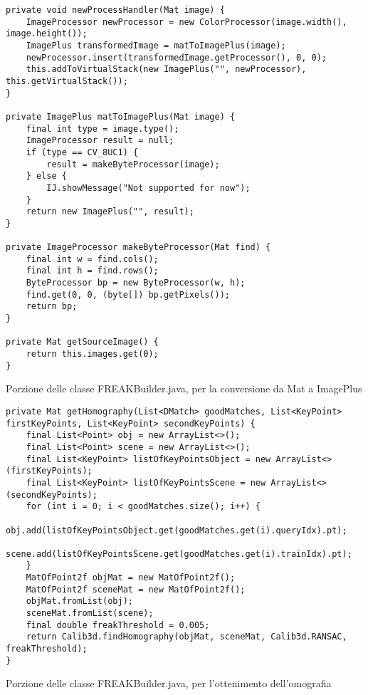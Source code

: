 \begin{listing}[H]
\begin{verbatim}
private void newProcessHandler(Mat image) {
    ImageProcessor newProcessor = new ColorProcessor(image.width(), image.height());
    ImagePlus transformedImage = matToImagePlus(image);
    newProcessor.insert(transformedImage.getProcessor(), 0, 0);
    this.addToVirtualStack(new ImagePlus("", newProcessor), this.getVirtualStack());
}

private ImagePlus matToImagePlus(Mat image) {
    final int type = image.type();
    ImageProcessor result = null;
    if (type == CV_8UC1) {
        result = makeByteProcessor(image);
    } else {
        IJ.showMessage("Not supported for now");
    }
    return new ImagePlus("", result);
}

private ImageProcessor makeByteProcessor(Mat find) {
    final int w = find.cols();
    final int h = find.rows();
    ByteProcessor bp = new ByteProcessor(w, h);
    find.get(0, 0, (byte[]) bp.getPixels());
    return bp;
}

private Mat getSourceImage() {
    return this.images.get(0);
}
\end{verbatim}
\caption{Porzione delle classe FREAKBuilder.java, per la conversione da Mat a ImagePlus}\label{lst:imageplusToMat}
\end{listing}

\begin{listing}[H]
\begin{verbatim}
private Mat getHomography(List<DMatch> goodMatches, List<KeyPoint> firstKeyPoints, List<KeyPoint> secondKeyPoints) {
    final List<Point> obj = new ArrayList<>();
    final List<Point> scene = new ArrayList<>();
    final List<KeyPoint> listOfKeyPointsObject = new ArrayList<>(firstKeyPoints);
    final List<KeyPoint> listOfKeyPointsScene = new ArrayList<>(secondKeyPoints);
    for (int i = 0; i < goodMatches.size(); i++) {
        obj.add(listOfKeyPointsObject.get(goodMatches.get(i).queryIdx).pt);
        scene.add(listOfKeyPointsScene.get(goodMatches.get(i).trainIdx).pt);
    }
    MatOfPoint2f objMat = new MatOfPoint2f();
    MatOfPoint2f sceneMat = new MatOfPoint2f();
    objMat.fromList(obj);
    sceneMat.fromList(scene);
    final double freakThreshold = 0.005;
    return Calib3d.findHomography(objMat, sceneMat, Calib3d.RANSAC, freakThreshold);
}
\end{verbatim}
\caption{Porzione delle classe FREAKBuilder.java, per l'ottenimento dell'omografia}\label{lst:homography}
\end{listing}

